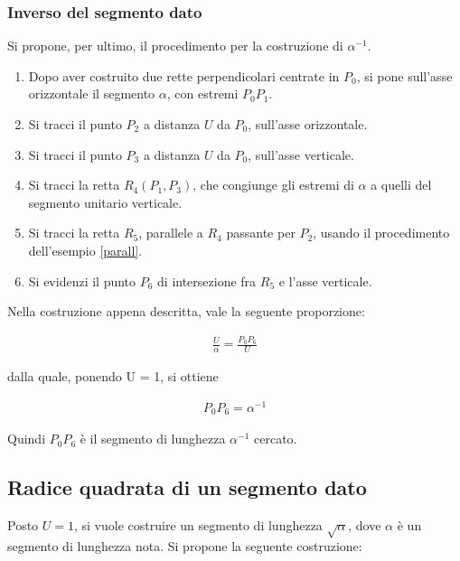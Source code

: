 \subsubsection{Inverso del segmento dato}
Si propone, per ultimo, il procedimento per la costruzione di $\alpha^{-1}$.
\begin{enumerate}
\item Dopo aver costruito due rette perpendicolari centrate in $P_{0}$, si pone sull'asse orizzontale il segmento $\alpha$, con estremi $P_{0} P_{1}$.

\item Si tracci il punto $P_{2}$ a distanza $U$ da $P_{0}$, sull'asse orizzontale.

\item Si tracci il punto $P_{3}$ a distanza $U$ da $P_{0}$, sull'asse verticale.

\item Si tracci la retta $R_{4}(P_{1}, P_{3})$, che congiunge gli estremi di $\alpha$ a quelli del segmento unitario verticale.

\item Si tracci la retta $R_{5}$, parallele a $R_{4}$ passante per $P_{2}$, usando il procedimento dell'esempio \ref{parall}.

\item Si evidenzi il punto $P_{6}$ di intersezione fra $R_{5}$ e l'asse verticale.
\end{enumerate}

Nella costruzione appena descritta, vale la seguente proporzione:

\begin{align*}
 \frac{U}{\alpha} = \frac{P_{0}P_{6}}{U}
\end{align*}

dalla quale, ponendo U = 1, si ottiene 

\begin{align*}
P_{0}P_{6} = \alpha^{-1}
\end{align*}

Quindi $P_{0}P_{6}$ è  il segmento di lunghezza $\alpha^{-1}$ cercato. 


\subsection{Radice quadrata di un segmento dato} \label{radi}

Posto $U = 1$, si vuole costruire un segmento di lunghezza $\sqrt{\alpha}$, dove $\alpha$ è un segmento di lunghezza nota. Si propone la seguente costruzione:

